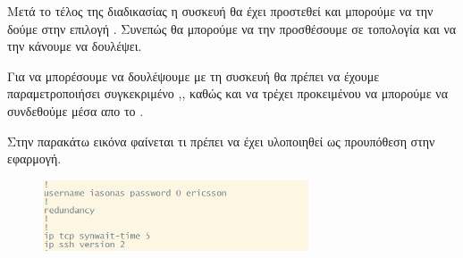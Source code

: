 \FloatBarrier

Μετά το τέλος της διαδικασίας η συσκευή θα έχει προστεθεί και μπορούμε να την δούμε στην επιλογή .
Συνεπώς θα μπορούμε να την προσθέσουμε σε τοπολογία και να την κάνουμε να δουλέψει.

Για να μπορέσουμε να δουλέψουμε με τη συσκευή θα πρέπει να έχουμε παραμετροποιήσει συγκεκριμένο ,, καθώς και να τρέχει 
προκειμένου να μπορούμε να συνδεθούμε μέσα απο το . 

Στην παρακάτω εικόνα φαίνεται τι πρέπει να έχει υλοποιηθεί ως προυπόθεση στην εφαρμογή.
\FloatBarrier

\begin{figure}[htb]
	\centering
	\includegraphics[width=0.7\textwidth]{graphics/ssh.png}
	\caption{ }
\end{figure}
